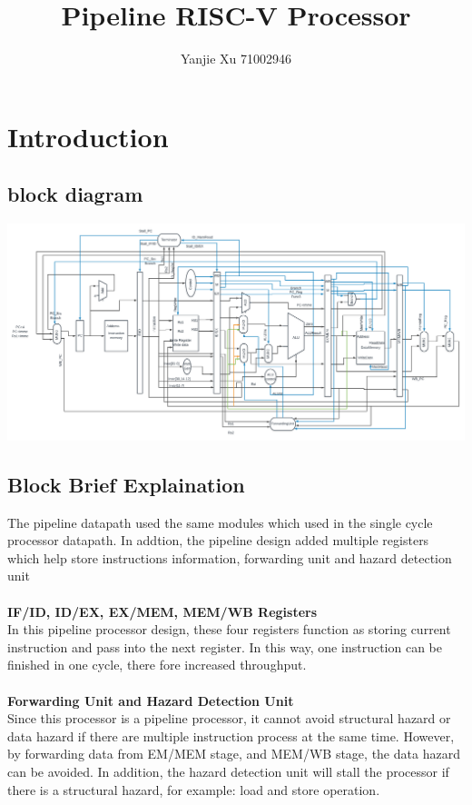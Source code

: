 \documentclass[12pt]{article}
\begin{document}
\title{Pipeline RISC-V Processor}
\author{Yanjie Xu 71002946}
\maketitle
\section{Introduction}
\subsection{block diagram}
\includegraphics[width=\linewidth]{dia1.png}

\subsection{Block Brief Explaination}
The pipeline datapath used the same modules which used in the single cycle processor datapath. In addtion, the pipeline design added multiple registers which help store instructions information, forwarding unit and hazard detection unit\\\\
\textbf{IF/ID, ID/EX, EX/MEM, MEM/WB Registers}\\
In this pipeline processor design, these four registers function as storing current instruction and pass into the next register. In this way, one instruction can be finished in one cycle, there fore increased throughput.\\\\
\textbf{Forwarding Unit and Hazard Detection Unit}\\
Since this processor is a pipeline processor, it cannot avoid structural hazard or data hazard if there are multiple instruction process at the same time. However, by forwarding data from EM/MEM stage, and MEM/WB stage, the data hazard can be avoided. In addition, the hazard detection unit will stall the processor if there is a structural hazard, for example: load and store operation.\\
\end{document}
